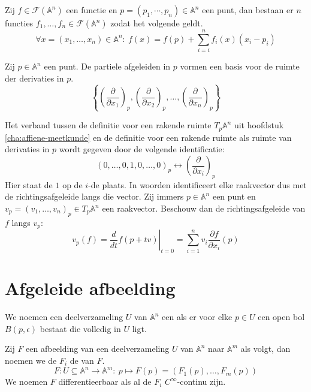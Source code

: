 \documentclass[main.tex]{subfiles}
\begin{document}
\begin{lem}
  Zij $f \in \mathcal{F}(\mathbb{A}^{n})$ een functie en $p = (p_{1},\dotsb,p_{n}) \in \mathbb{A}^{n}$ een punt, dan bestaan er $n$ functies $f_{1},\dotsc,f_{n} \in \mathcal{F}(\mathbb{A}^{n})$ zodat het volgende geldt.
  \[
  \forall x = (x_{1},\dotsc,x_{n})\in\mathbb{A}^{n}:\ f(x) = f(p) + \sum_{i=i}^{n}f_{i}(x)(x_{i}-p_{i})
  \]
\end{lem}

\begin{st}
  Zij $p\in\mathbb{A}^{n}$ een punt.
  De partiele afgeleiden in $p$ vormen een basis voor de ruimte der derivaties in $p$.
  \[ \left\{ \left(\frac{\partial}{\partial x_{1}}\right)_{p}, \left(\frac{\partial}{\partial x_{2}}\right)_{p}, \dotsc , \left(\frac{\partial}{\partial x_{n}}\right)_{p}\right\}  \]
\end{st}

\begin{opm}
  Het verband tussen de definitie voor een rakende ruimte $T_{p}\mathbb{A}^{n}$ uit hoofdstuk \ref{cha:affiene-meetkunde} en de definitie voor een rakende ruimte als ruimte van derivaties in $p$ wordt gegeven door de volgende identificatie:
  \[ 
  (0,\dotsc,0,1,0,\dotsc,0)_{p}
  \leftrightarrow
  \left(\frac{\partial}{\partial x_{i}}\right)_{p}
  \]
  Hier staat de $1$ op de $i$-de plaats.
  In woorden identificeert elke raakvector dus met de richtingsafgeleide langs die vector.
  Zij immers $p\in\mathbb{A}^{n}$ een punt en $v_{p} = (v_{1},\dotsc,v_{n})_{p} \in T_{p}\mathbb{A}^{n}$ een raakvector.
  Beschouw dan de richtingsafgeleide van $f$ langs $v_{p}$:
  \[ v_{p}(f) = \left.\frac{d}{dt}f(p+tv)\right|_{t=0} = \sum_{i=1}^{n}v_{i}\frac{\partial f}{\partial x_{i}}(p)\]
\end{opm}

\section{Afgeleide afbeelding}
\label{sec:afgeleide-afbeelding}

\begin{de}
  We noemen een deelverzameling $U$ van $\mathbb{A}^{n}$ een  als er voor elke $p\in U$ een open bol $B(p,\epsilon)$ bestaat die volledig in $U$ ligt.
\end{de}

\begin{de}
  Zij $F$ een afbeelding van een deelverzameling $U$ van $\mathbb{A}^{n}$ naar $\mathbb{A}^{m}$ als volgt, dan noemen we de $F_{i}$ de  van $F$.
  \[ F: U\subseteq \mathbb{A}^{n} \rightarrow \mathbb{A}^{m}:\ p\mapsto F(p) = (F_{1}(p),\dotsc,F_{m}(p)) \]  
  We noemen $F$ differentieerbaar als al de $F_{i}$ $C^{\infty}$-continu zijn. 
\end{de}
\end{document}
